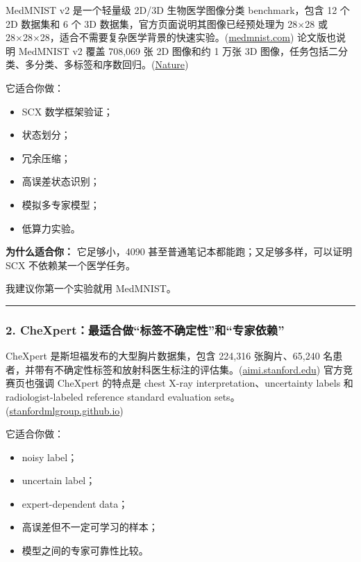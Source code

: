 \documentclass[
  12pt,
]{ctexart}
\providecommand{\tightlist}{%
  \setlength{\itemsep}{0pt}\setlength{\parskip}{0pt}}
\begin{document}
MedMNIST v2 是一个轻量级 2D/3D 生物医学图像分类 benchmark，包含 12 个 2D
数据集和 6 个 3D 数据集，官方页面说明其图像已经预处理为 28×28 或
28×28×28，适合不需要复杂医学背景的快速实验。(\href{https://arxiv.org/html/2406.17557v1?utm_source=chatgpt.com}{medmnist.com})
论文版也说明 MedMNIST v2 覆盖 708,069 张 2D 图像和约 1 万张 3D
图像，任务包括二分类、多分类、多标签和序数回归。(\href{https://arxiv.org/abs/2501.07314?utm_source=chatgpt.com}{Nature})

它适合你做：

\begin{itemize}
\tightlist
\item
  SCX 数学框架验证；
\item
  状态划分；
\item
  冗余压缩；
\item
  高误差状态识别；
\item
  模拟多专家模型；
\item
  低算力实验。
\end{itemize}

\textbf{为什么适合你：} 它足够小，4090
甚至普通笔记本都能跑；又足够多样，可以证明 SCX 不依赖某一个医学任务。

我建议你第一个实验就用 MedMNIST。

\begin{center}\rule{0.5\linewidth}{0.5pt}\end{center}

\subsubsection{2.
CheXpert：最适合做``标签不确定性''和``专家依赖''}\label{chexpertux6700ux9002ux5408ux505aux6807ux7b7eux4e0dux786eux5b9aux6027ux548cux4e13ux5bb6ux4f9dux8d56}

CheXpert 是斯坦福发布的大型胸片数据集，包含 224,316 张胸片、65,240
名患者，并带有不确定性标签和放射科医生标注的评估集。(\href{https://arxiv.org/abs/2505.05427?utm_source=chatgpt.com}{aimi.stanford.edu})
官方竞赛页也强调 CheXpert 的特点是 chest X-ray
interpretation、uncertainty labels 和 radiologist-labeled reference
standard evaluation
sets。(\href{https://arxiv.org/abs/2404.07965?utm_source=chatgpt.com}{stanfordmlgroup.github.io})

它适合你做：

\begin{itemize}
\tightlist
\item
  noisy label；
\item
  uncertain label；
\item
  expert-dependent data；
\item
  高误差但不一定可学习的样本；
\item
  模型之间的专家可靠性比较。
\end{itemize}
\end{document}
